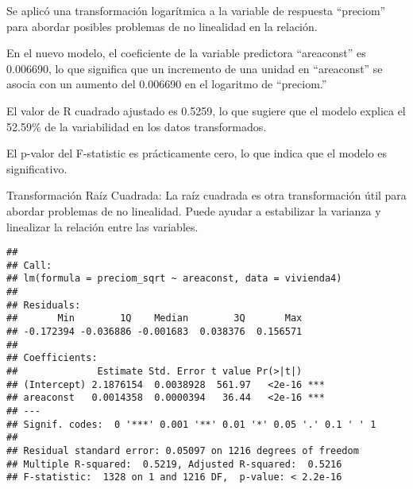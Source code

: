 \documentclass[
]{article}
\newenvironment{Shaded}{\begin{snugshade}}{\end{snugshade}}
\newcommand{\AttributeTok}[1]{\textcolor[rgb]{0.13,0.29,0.53}{#1}}
\newcommand{\CommentTok}[1]{\textcolor[rgb]{0.56,0.35,0.01}{\textit{#1}}}
\newcommand{\FunctionTok}[1]{\textcolor[rgb]{0.13,0.29,0.53}{\textbf{#1}}}
\newcommand{\NormalTok}[1]{#1}
\newcommand{\OtherTok}[1]{\textcolor[rgb]{0.56,0.35,0.01}{#1}}
\newcommand{\SpecialCharTok}[1]{\textcolor[rgb]{0.81,0.36,0.00}{\textbf{#1}}}
\begin{document}
Se aplicó una transformación logarítmica a la variable de respuesta
``preciom'' para abordar posibles problemas de no linealidad en la
relación.

En el nuevo modelo, el coeficiente de la variable predictora
``areaconst'' es 0.006690, lo que significa que un incremento de una
unidad en ``areaconst'' se asocia con un aumento del 0.006690 en el
logaritmo de ``preciom.''

El valor de R cuadrado ajustado es 0.5259, lo que sugiere que el modelo
explica el 52.59\% de la variabilidad en los datos transformados.

El p-valor del F-statistic es prácticamente cero, lo que indica que el
modelo es significativo.

Transformación Raíz Cuadrada: La raíz cuadrada es otra transformación
útil para abordar problemas de no linealidad. Puede ayudar a estabilizar
la varianza y linealizar la relación entre las variables.

\begin{Shaded}
\end{Shaded}

\begin{verbatim}
## 
## Call:
## lm(formula = preciom_sqrt ~ areaconst, data = vivienda4)
## 
## Residuals:
##       Min        1Q    Median        3Q       Max 
## -0.172394 -0.036886 -0.001683  0.038376  0.156571 
## 
## Coefficients:
##              Estimate Std. Error t value Pr(>|t|)    
## (Intercept) 2.1876154  0.0038928  561.97   <2e-16 ***
## areaconst   0.0014358  0.0000394   36.44   <2e-16 ***
## ---
## Signif. codes:  0 '***' 0.001 '**' 0.01 '*' 0.05 '.' 0.1 ' ' 1
## 
## Residual standard error: 0.05097 on 1216 degrees of freedom
## Multiple R-squared:  0.5219, Adjusted R-squared:  0.5216 
## F-statistic:  1328 on 1 and 1216 DF,  p-value: < 2.2e-16
\end{verbatim}
\end{document}
